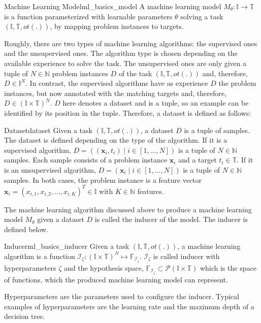 \begin{Def}{Machine Learning Model}{ml_basics_model}
A machine learning model $M_\theta: \mathbb{I} \to \mathbb{T}$ is a function parameterized with learnable parameters $\theta$ solving a task $(\mathbb{I}, \mathbb{T}, ot(.))$, by mapping problem instances to targets.
\end{Def}

Roughly, there are two types of machine learning algorithms: the supervised ones and the unsupervised ones. The algorithm type is chosen depending on the available experience to solve the task. The unsupervised ones are only given a tuple of $N \in \mathbb{N}$ problem instances $D$ of the task $(\mathbb{I}, \mathbb{T}, ot(.))$ and, therefore, $D \in \mathbb{I}^N$. In contrast, the supervised algorithms have as experience $D$ the problem instances, but now annotated with the matching targets and, therefore, $D \in (\mathbb{I} \times \mathbb{T})^N$. $D$ here denotes a dataset and is a tuple, so an example can be identified by its position in the tuple. Therefore, a dataset is defined as follows:

\begin{Def}{Dataset}{dataset}
Given a task $(\mathbb{I}, \mathbb{T}, ot(.))$, a dataset $D$ is a tuple of samples. The dataset is defined depending on the type of the algorithm.
If it is a supervised algorithm, $D = ((\mathbf{x}_i, t_i) \mid i \in [1,...,N])$ is a tuple of $N \in \mathbb{N}$ samples. Each sample consists of a problem instance $\mathbf{x}_i$ and a target $t_i \in \mathbb{T}$.
If it is an unsupervised algorithm, $D = (\mathbf{x}_i \mid i \in [1,...,N])$ is a tuple of $N \in \mathbb{N}$ samples.
In both cases, the problem instance is a feature vector $\mathbf{x}_i = (x_{i,1}, x_{i,2},...,x_{i,K})^T \in \mathbb{I}$ with $K \in \mathbb{N}$ features.
\end{Def}

The machine learning algorithm discussed above to produce a machine learning model $M_\theta$ given a dataset $D$ is called the inducer of the model. The inducer is defined below.

\begin{Def}{Inducer}{ml_basics_inducer}
Given a task $(\mathbb{I}, \mathbb{T}, ot(.))$, a machine learning algorithm is a function $\mathcal{I_\zeta}: (\mathbb{I} \times \mathbb{T})^N \mapsto \mathbb{F}_{\mathcal{I_\zeta}}$. $\mathcal{I_\zeta}$ is called inducer with hyperparameters $\zeta$ and the hypothesis space, $\mathbb{F}_{\mathcal{I_\zeta}} \subset \mathcal{P}(\mathbb{I} \times \mathbb{T})$ which is the space of functions, which the produced machine learning model can represent.
\end{Def}
Hyperparameters are the parameters used to configure the inducer. Typical examples of hyperparameters are the learning rate and the maximum depth of a decision tree.

